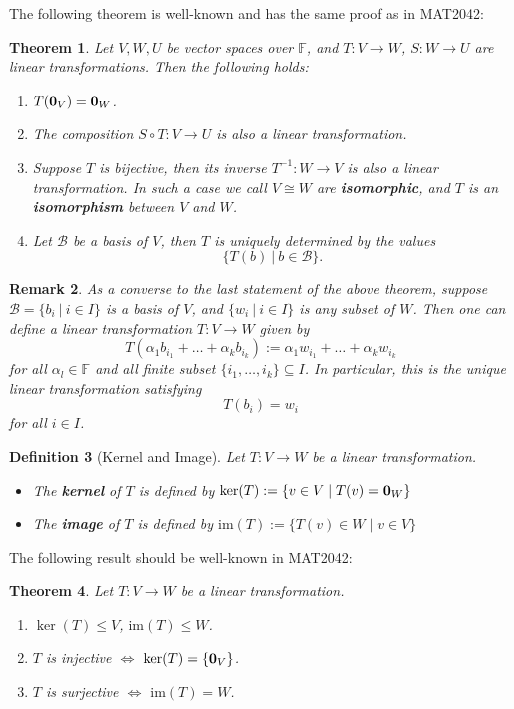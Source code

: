 \documentclass[12pt]{amsbook}
\newtheorem{theorem}{Theorem}[section]
\newtheorem{definition}[theorem]{Definition}
\newtheorem{remark}[theorem]{Remark}
\begin{document}
The following theorem is well-known and has the same proof as in MAT2042:
\begin{theorem}
    Let $V, W, U$ be vector spaces over $\mathbb{F}$, and $T:V \to W$, $S: W \to U$ are linear transformations. Then the following holds:
    \begin{enumerate}
        \item $T({\bf 0}_V) = {\bf 0}_W$.
        \item The composition $S \circ T: V \to U$ is also a linear transformation.
        \item Suppose $T$ is bijective, then its inverse $T^{-1}: W \to V$ is also a linear transformation. In such a case we call $V \cong W$ are {\bf isomorphic}, and $T$ is an {\bf isomorphism} between $V$ and $W$.
        \item Let $\mathcal{B}$ be a basis of $V$, then $T$ is uniquely determined by the values 
        $$\{T(b)\ |\ b \in \mathcal{B}\}.$$
    \end{enumerate}
\end{theorem}

\begin{remark} \label{rmk-basislineartrans}
As a converse to the last statement of the above theorem, suppose $\mathcal{B} = \{ b_i\ |\ i \in I\}$ is a basis of $V$, and $\{w_i\ |\ i \in I\}$ is any subset of $W$. Then one can define a linear transformation
$T:V \to W$ given by
$$T(\alpha_1b_{i_1} + \dots + \alpha_kb_{i_k}) := \alpha_1w_{i_1} + \dots + \alpha_kw_{i_k}$$
for all $\alpha_l \in \mathbb{F}$ and all finite subset $\{i_1,\dots,i_k\} \subseteq I$. In particular, this is the unique linear transformation satisfying
$$T(b_i) = w_i$$
for all $i \in I$.
\end{remark}

\begin{definition}[Kernel and Image]
    Let $T: V \to W$ be a linear transformation.
    \begin{itemize}
        \item The {\bf kernel} of $T$ is defined by  $ \ker(T) := \{ v \in V \mid T(v) = {\bf 0}_W \} $
        \item The {\bf image} of $T$ is defined by $ \text{im}(T) := \{ T(v) \in W \mid v \in V \} $
    \end{itemize}
\end{definition}

The following result should be well-known in MAT2042:
\begin{theorem}
Let $T:V \to W$ be a linear transformation.
\begin{enumerate}
    \item $\ker(T) \leq V$, $\mathrm{im}(T) \leq W$.
    \item $T$ is injective $\iff$ $\ker(T) = \{{\bf 0}_V\}$.
    \item $T$ is surjective $\iff$ $\mathrm{im}(T) = W$.
\end{enumerate}
\end{theorem}
\end{document}
